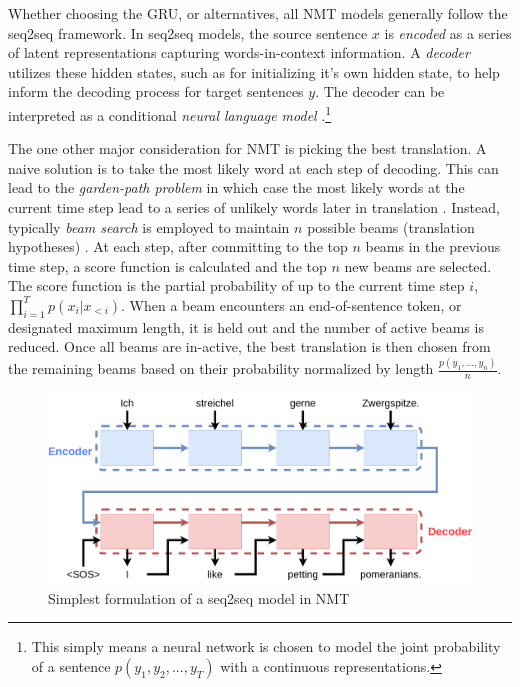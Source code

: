 Whether choosing the \ac{GRU}, or alternatives,  all \ac{NMT} models generally follow the \ac{seq2seq} framework. In \ac{seq2seq} models, the source sentence $x$ is \textit{encoded} as a series of latent representations capturing words-in-context information. A \textit{decoder} utilizes these hidden states, such as for initializing it's own hidden state, to help inform the decoding process for target sentences $y$. The decoder can be interpreted as a conditional \textit{neural language model} \cite{koehn2017NMT}.\footnote{This simply means a neural network is chosen to model the joint probability of a sentence $p(y_{1}, y_{2}, ..., y_{T})$ with a continuous representations.}

The one other major consideration for \ac{NMT} is picking the best translation. A naive solution is to take the most likely word at each step of decoding. This can lead to the \textit{garden-path problem} in which case the most likely words at the current time step lead to a series of unlikely words later in translation \cite{koehn2017NMT}. Instead, typically \textit{beam search} is employed to maintain $n$ possible beams (translation hypotheses) \cite{koehn2017NMT}. At each step, after committing to the top $n$ beams  in the previous time step, a score function is calculated and the top $n$ new beams are selected. The score function is the partial probability of up to the current time step $i$, $\prod^{T}_{i=1} p(x_{i} | x_{<i})$. When a beam encounters an end-of-sentence token, or designated maximum length, it is held out and the number of active beams is reduced. Once all beams are in-active, the best translation is then chosen from the remaining beams based on their probability normalized by length $\frac{p(y_{1}, ..., y_{n})}{n}$. 

\begin{figure}
	\includegraphics[width=\linewidth]{seq2seq.png}
	\caption{Simplest formulation of a \ac{seq2seq} model in \ac{NMT}} 
	\label{fig:seqseq2}
\end{figure}



